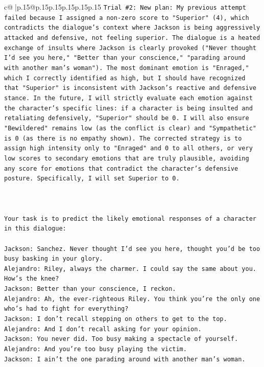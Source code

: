 \documentclass{article}
\begin{document}
{\begin{supertabular}{c@{$\;$}|p{.15\linewidth}@{}p{.15\linewidth}p{.15\linewidth}p{.15\linewidth}p{.15\linewidth}p{.15\linewidth}}
{{{\texttt{Trial \#2: New plan: My previous attempt failed because I assigned a non{-}zero score to "Superior" (4), which contradicts the dialogue's context where Jackson is being aggressively attacked and defensive, not feeling superior. The dialogue is a heated exchange of insults where Jackson is clearly provoked ("Never thought I'd see you here," "Better than your conscience," "parading around with another man's woman"). The most dominant emotion is "Enraged," which I correctly identified as high, but I should have recognized that "Superior" is inconsistent with Jackson's reactive and defensive stance. In the future, I will strictly evaluate each emotion against the character's specific lines: if a character is being insulted and retaliating defensively, "Superior" should be 0. I will also ensure "Bewildered" remains low (as the conflict is clear) and "Sympathetic" is 0 (as there is no empathy shown). The corrected strategy is to assign high intensity only to "Enraged" and 0 to all others, or very low scores to secondary emotions that are truly plausible, avoiding any score for emotions that contradict the character's defensive posture. Specifically, I will set Superior to 0.} \\
\\ 
\\ 
\\ 
\texttt{Your task is to predict the likely emotional responses of a character in this dialogue:} \\
\\ 
\texttt{Jackson: Sanchez. Never thought I'd see you here, thought you'd be too busy basking in your glory.} \\
\texttt{Alejandro: Riley, always the charmer. I could say the same about you. How's the knee?} \\
\texttt{Jackson: Better than your conscience, I reckon.} \\
\texttt{Alejandro: Ah, the ever{-}righteous Riley. You think you're the only one who's had to fight for everything?} \\
\texttt{Jackson: I don't recall stepping on others to get to the top.} \\
\texttt{Alejandro: And I don't recall asking for your opinion.} \\
\texttt{Jackson: You never did. Too busy making a spectacle of yourself.} \\
\texttt{Alejandro: And you're too busy playing the victim. } \\
\texttt{Jackson: I ain't the one parading around with another man's woman.} \\
}}}
\end{supertabular}}
\end{document}

